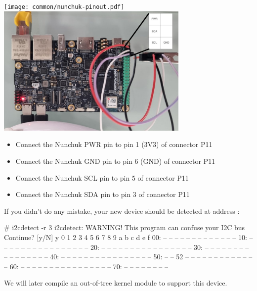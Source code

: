 \texttt{[image: common/nunchuk-pinout.pdf]}
\includegraphics[width=0.7\textwidth]{labs/kernel-i2c-multiplexing-imx93-frdm/imx93-frdm-connect-nunchuk.png}

\begin{itemize}
\item Connect the Nunchuk PWR pin to pin 1 (3V3) of connector P11
\item Connect the Nunchuk GND pin to pin 6 (GND) of connector P11
\item Connect the Nunchuk SCL pin to pin 5 of connector P11
\item Connect the Nunchuk SDA pin to pin 3 of connector P11
\end{itemize}

If you didn't do any mistake, your new device should be detected at
address :

\begin{bashinput}
# i2cdetect -r 3
i2cdetect: WARNING! This program can confuse your I2C bus
Continue? [y/N] y
     0  1  2  3  4  5  6  7  8  9  a  b  c  d  e  f
00:          -- -- -- -- -- -- -- -- -- -- -- -- --
10: -- -- -- -- -- -- -- -- -- -- -- -- -- -- -- --
20: -- -- -- -- -- -- -- -- -- -- -- -- -- -- -- --
30: -- -- -- -- -- -- -- -- -- -- -- -- -- -- -- --
40: -- -- -- -- -- -- -- -- -- -- -- -- -- -- -- --
50: -- -- 52 -- -- -- -- -- -- -- -- -- -- -- -- --
60: -- -- -- -- -- -- -- -- -- -- -- -- -- -- -- --
70: -- -- -- -- -- -- -- --
\end{bashinput}

We will later compile an out-of-tree kernel module to support this device.
